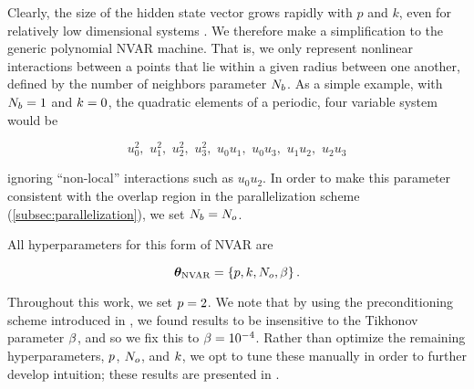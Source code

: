 Clearly, the size of the hidden state vector grows rapidly with $p$ and $k$,
even for relatively low dimensional systems
\citep<see supplemental material of>[for details]{chen_next_2022}.
We therefore make a simplification to the generic polynomial NVAR machine.
That is, we only represent nonlinear interactions between a points that lie
within a given radius between one another, defined by the number of neighbors parameter $N_{b}$.
As a simple example, with $N_{b}=1$ and $k=0$, the quadratic elements of a periodic, four variable
system would be
\begin{linenomath*}\begin{equation*}
    u_0^2, \,\, u_1^2, \,\, u_2^2, \,\, u_3^2, \,\,
    u_0u_1, \,\, u_0u_3, \,\, u_1u_2, \,\, u_2u_3
\end{equation*}\end{linenomath*}
ignoring ``non-local'' interactions such as $u_0u_2$.
In order to make this parameter consistent with the overlap region in the
parallelization scheme (\cref{subsec:parallelization}),
we set $N_{b} = N_{o}$.

All hyperparameters for this form of NVAR are
\begin{linenomath*}\begin{equation*}
    \bm{\theta}_\text{NVAR} =
    \{ p, k, N_{o}, \beta \} \, .
\end{equation*}\end{linenomath*}
Throughout this work, we set $p = 2$.
We note that by using the preconditioning scheme introduced in
\citet{chen_next_2022},
we found results to be insensitive to the Tikhonov parameter $\beta$, and so
we fix this to $\beta = 10^{-4}$.
Rather than optimize the remaining hyperparameters,
$p$, $N_{o}$, and $k$, we opt to tune
these manually in order to further develop intuition; these results are
presented in .

